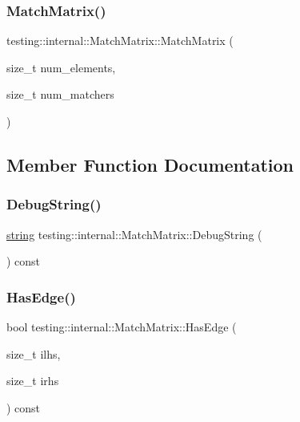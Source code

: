 \subsubsection{\texorpdfstring{Match\+Matrix()}{MatchMatrix()}}
{\footnotesize\ttfamily testing\+::internal\+::\+Match\+Matrix\+::\+Match\+Matrix (\begin{DoxyParamCaption}\item[{size\+\_\+t}]{num\+\_\+elements,  }\item[{size\+\_\+t}]{num\+\_\+matchers }\end{DoxyParamCaption})\hspace{0.3cm}{\ttfamily [inline]}}



\subsection{Member Function Documentation}
\mbox{\label{classtesting_1_1internal_1_1_match_matrix_a9dc07616205c58e2747dead0a14467b2}} 
\subsubsection{\texorpdfstring{Debug\+String()}{DebugString()}}
{\footnotesize\ttfamily \hyperlink{namespacetesting_1_1internal_a8e8ff5b11e64078831112677156cb111}{string} testing\+::internal\+::\+Match\+Matrix\+::\+Debug\+String (\begin{DoxyParamCaption}{ }\end{DoxyParamCaption}) const}

\mbox{\label{classtesting_1_1internal_1_1_match_matrix_a94c7641a932739734cb2207b1bca4036}} 
\subsubsection{\texorpdfstring{Has\+Edge()}{HasEdge()}}
{\footnotesize\ttfamily bool testing\+::internal\+::\+Match\+Matrix\+::\+Has\+Edge (\begin{DoxyParamCaption}\item[{size\+\_\+t}]{ilhs,  }\item[{size\+\_\+t}]{irhs }\end{DoxyParamCaption}) const\hspace{0.3cm}{\ttfamily [inline]}}

